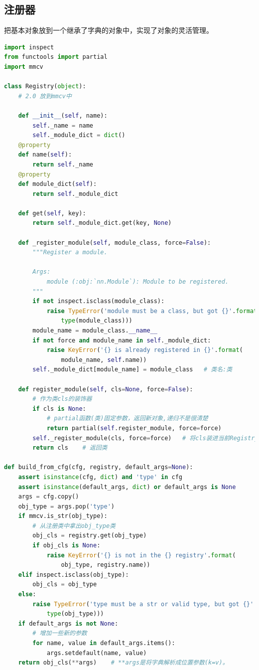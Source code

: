 \documentclass[UTF8]{ctexart}
\begin{document}
\subsection{注册器}
把基本对象放到一个继承了字典的对象中，实现了对象的灵活管理。
\lstset{style=mystyle}
\begin{lstlisting}[language=Python]
import inspect
from functools import partial
import mmcv

class Registry(object):
    # 2.0 放到mmcv中

    def __init__(self, name):
        self._name = name
        self._module_dict = dict()
    @property
    def name(self):
        return self._name
    @property
    def module_dict(self):
        return self._module_dict

    def get(self, key):
        return self._module_dict.get(key, None)

    def _register_module(self, module_class, force=False):
        """Register a module.

        Args:
            module (:obj:`nn.Module`): Module to be registered.
        """
        if not inspect.isclass(module_class):
            raise TypeError('module must be a class, but got {}'.format(
                type(module_class)))
        module_name = module_class.__name__
        if not force and module_name in self._module_dict:
            raise KeyError('{} is already registered in {}'.format(
                module_name, self.name))
        self._module_dict[module_name] = module_class   # 类名:类

    def register_module(self, cls=None, force=False):
        # 作为类cls的装饰器
        if cls is None:
            # partial函数(类)固定参数，返回新对象,递归不是很清楚
            return partial(self.register_module, force=force)    
        self._register_module(cls, force=force)   # 将cls装进当前Registry对象的中_module_dict
        return cls    # 返回类

def build_from_cfg(cfg, registry, default_args=None):
	assert isinstance(cfg, dict) and 'type' in cfg
	assert isinstance(default_args, dict) or default_args is None
	args = cfg.copy()
	obj_type = args.pop('type')
	if mmcv.is_str(obj_type):
		# 从注册类中拿出obj_type类
		obj_cls = registry.get(obj_type)
		if obj_cls is None:
			raise KeyError('{} is not in the {} registry'.format(
				obj_type, registry.name))
	elif inspect.isclass(obj_type):
		obj_cls = obj_type
	else:
		raise TypeError('type must be a str or valid type, but got {}'.format(
			type(obj_type)))
	if default_args is not None:
		# 增加一些新的参数
		for name, value in default_args.items():
			args.setdefault(name, value)
	return obj_cls(**args)    # **args是将字典解析成位置参数(k=v)。
\end{lstlisting}
\end{document}
